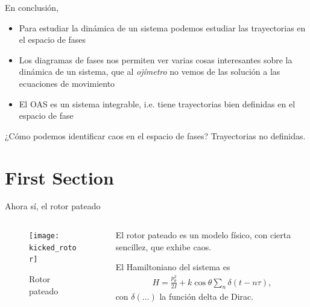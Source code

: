 \documentclass[aspectratio=169,xcolor=dvipsnames,7pt]{beamer}
\begin{document}
\begin{frame}
En conclusión,
\begin{itemize}
\item Para estudiar la dinámica de un sistema podemos estudiar las trayectorias en el espacio de fases
\item Los diagramas de fases nos permiten ver varias cosas interesantes sobre
la dinámica de un sistema, que al \textit{ojímetro} no vemos de las solución a las ecuaciones de movimiento
\item El OAS es un \alert{sistema integrable}, i.e. tiene trayectorias bien definidas en el espacio de fase
\end{itemize}

\vspace*{1cm}
¿Cómo podemos identificar caos en el espacio de fases? Trayectorias no definidas.
\end{frame}

\section{First Section}

\begin{frame}{Ahora sí, el rotor pateado}
\begin{columns}
\begin{column}{0.5\textwidth}  %
		\vspace*{-.4cm}
    \begin{figure}
     \texttt{[image: kicked\_rotor]}
     \vspace*{-5mm}
     \caption{\normalsize Rotor pateado}
     \end{figure}
\end{column}

\begin{column}{0.5\textwidth}
El rotor pateado es un modelo físico, con cierta sencillez, que exhibe caos.\vskip 15pt

El Hamiltoniano del sistema es
\begin{align*}
H = \frac{p^2_{\theta}}{2I} + k\cos\theta\sum_n\delta(t- n \tau),
\end{align*}
con $\delta(\ldots)$ la función delta de Dirac.
\end{column}
\end{columns}
\end{frame}
\end{document}
